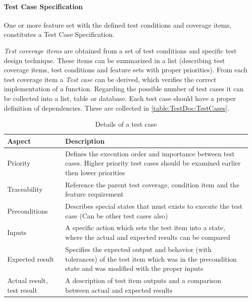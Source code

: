\paragraph{Test Case Specification}
One or more feature set with the defined test conditions and coverage items, constitutes a Test Case Specification.

\textit{Test coverage items} are obtained from a set of test conditions and specific test design technique. These items can be summarized in a list (describing test coverage items, test conditions and feature sets with proper priorities). From each test coverage item a \textit{Test case} can be derived, which verifies the correct implementation of a function. Regarding the possible number of test cases it can be collected into a list, table or database. Each test case should have a proper definition of dependencies. These are collected in \autoref{table:TestDoc:TestCases}.

\begin{table}[h]
	\caption{Details of a test case}
	\label{table:TestDoc:TestCases}
	\begin{center}
		\renewcommand{\arraystretch}{1.8}
		\begin{tabu} 
			to 0.9 \textwidth
			{  X[c]  X[c] }
			\toprule
			Aspect                     & Description                                                                                                                                               \\ \midrule
			Priority                   & Defines the execution order and importance between test cases. Higher priority test cases should be examined earlier then lower priorities                \\
			Traceability               & Reference the parent test coverage, condition item and the feature requirement                                                                            \\
			Preconditions              & Describes special states that must exists to execute the test case (Can be other test cases also)                                                         \\
			Inputs                     & A specific action which sets the test item into a state, where the actual and expected results can be compared                                            \\
			Expected result            & Specifies the expected output and behavior (with tolerances) of the test item which was in the precondition state and was modified with the proper inputs \\
			Actual result, test result & A description of test item outputs and a comparison between actual and expected results                                                                   \\ \bottomrule
		\end{tabu}
	\end{center}
\end{table} 

